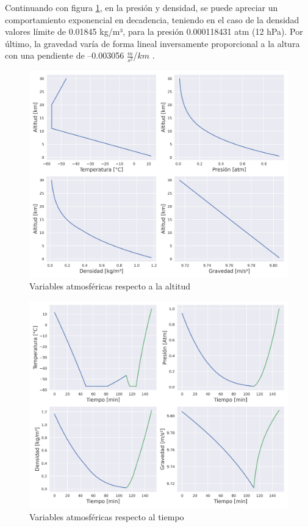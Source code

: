 Continuando con figura \ref{fig:atmosferica_altitud},  en la presión y densidad, se puede apreciar un comportamiento exponencial en decadencia, teniendo en el caso de la densidad valores límite de 0.01845 kg/m³, para la presión 0.000118431 atm (12 hPa). Por último, la gravedad varía de forma lineal inversamente proporcional a la altura con una pendiente de --0.003056 $\frac{m}{s^{2}}$/$km$ .

\begin{figure}[h]
    \centering
    \includegraphics[width=0.85\linewidth]{document/figures/03_atmsferica_vs_altitud.png}
    \caption{Variables atmosféricas respecto a la altitud}
    \label{fig:atmosferica_altitud}
\end{figure}

\newpage

\begin{figure}[!t]
    \centering
    \includegraphics[width=0.75\linewidth]{document/figures/03_atmsferica_vs_tiempo.png}
    \caption{Variables atmosféricas respecto al tiempo}
    \label{fig:atmosferica_tiempo}
\end{figure}

